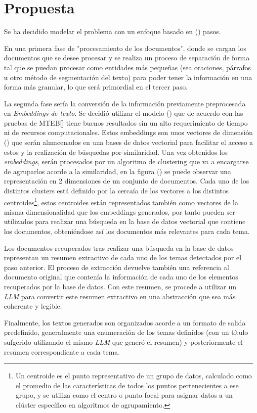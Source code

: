 \chapter{Propuesta}\label{chapter:proposal}
    Se ha decidido modelar el problema con un enfoque basado en () pasos.

    En una primera fase de "procesamiento de los documentos", donde se cargan los documentos que se desee procesar y se realiza un proceso de separación de forma tal que se puedan procesar como entidades más pequeñas (sea oraciones, párrafos u otro método de segmentación del texto) para poder tener la información en una forma más granular, lo que será primordial en el tercer paso.
    
    La segunda fase sería la conversión de la información previamente preprocesada en \emph{Embeddings de texto}. Se decidió utilizar el modelo () que de acuerdo con las pruebas de MTEB[\cite{leaderboard}] tiene buenos resultados sin un alto requerimiento de tiempo ni de recursos computacionales. Estos embeddings son unos vectores de dimensión () que serán almacenados en una bases de datos vectorial para facilitar el acceso a estos y la realización de búsquedas por similaridad.
    Una vez obtenidos los \emph{embeddings}, serán procesados por un algoritmo de clustering que va a encargarse de agruparlos acorde a la similaridad, en la figura () se puede observar una representación en 2 dimensiones de un conjunto de documentos. Cada uno de los distintos clusters está definido por la cercaía de los vectores a los distintos centroides\footnote{Un centroide es el punto representativo de un grupo de datos, calculado como el promedio de las características de todos los puntos pertenecientes a ese grupo, y se utiliza como el centro o punto focal para asignar datos a un clúster específico en algoritmos de agrupamiento.}, estos centroides están representados también como vectores de la misma dimensionalidad que los embeddings generados, por tanto pueden ser utilizados para realizar una búsqueda en la base de datos vectorial que contiene los documentos, obteniéndose así los documentos más relevantes para cada tema.

    Los documentos recuperados tras realizar una búsqueda en la base de datos representan un resumen extractivo de cada uno de los temas detectados por el paso anterior. El proceso de extracción devuelve también una referencia al documento original que contenía la información de cada uno de los elementos recuperados por la base de datos. Con este resumen, se procede a utilizar un \emph{LLM} para convertir este resumen extractivo en una abstracción que sea más coherente y legible.

    Finalmente, los textos generados son organizados acorde a un formato de salida predefinido, generalmente una enumeración de los temas definidos (con un título sufgerido utilizando el mismo \emph{LLM} que generó el resumen) y posteriormente el resumen correspondiente a cada tema.
